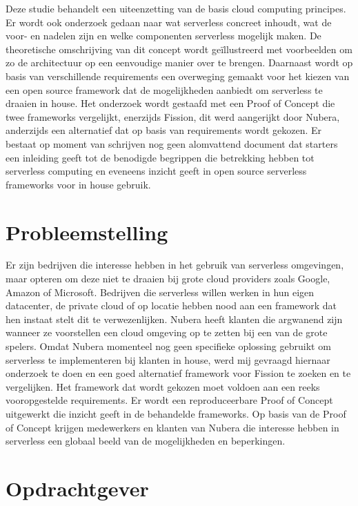 Deze studie behandelt een uiteenzetting van de basis cloud computing principes. Er wordt ook onderzoek gedaan naar wat serverless concreet inhoudt, wat de voor- en nadelen zijn en welke componenten serverless mogelijk maken. De theoretische omschrijving van dit concept wordt geïllustreerd met voorbeelden om zo de architectuur op een eenvoudige manier over te brengen. Daarnaast wordt op basis van verschillende requirements een overweging gemaakt voor het kiezen van een open source framework dat de mogelijkheden aanbiedt om serverless te draaien in house. Het onderzoek wordt gestaafd met een Proof of Concept die twee frameworks vergelijkt, enerzijds Fission, dit werd aangerijkt door Nubera, anderzijds een alternatief dat op basis van requirements wordt gekozen. Er bestaat op moment van schrijven nog geen alomvattend document dat starters een inleiding geeft tot de benodigde begrippen die betrekking hebben tot serverless computing en eveneens inzicht geeft in open source serverless frameworks voor in house gebruik.

\section{Probleemstelling}
\label{sec:probleemstelling}

Er zijn bedrijven die interesse hebben in het gebruik van serverless omgevingen, maar opteren om deze niet te draaien bij grote cloud providers zoals Google, Amazon of Microsoft. Bedrijven die serverless willen werken in hun eigen datacenter, de private cloud of op locatie hebben nood aan een framework dat hen instaat stelt dit te verwezenlijken. Nubera heeft klanten die argwanend zijn wanneer ze voorstellen een cloud omgeving op te zetten bij een van de grote spelers. Omdat Nubera momenteel nog geen specifieke oplossing gebruikt om serverless te implementeren bij klanten in house, werd mij gevraagd hiernaar onderzoek te doen en een goed alternatief framework voor Fission te zoeken en te vergelijken. Het framework dat wordt gekozen moet voldoen aan een reeks vooropgestelde requirements. Er wordt een reproduceerbare Proof of Concept uitgewerkt die inzicht geeft in de behandelde frameworks. Op basis van de Proof of Concept krijgen medewerkers en klanten van Nubera die interesse hebben in serverless een globaal beeld van de mogelijkheden en beperkingen.

\section{Opdrachtgever}
\label{sec:opdrachtgever}

